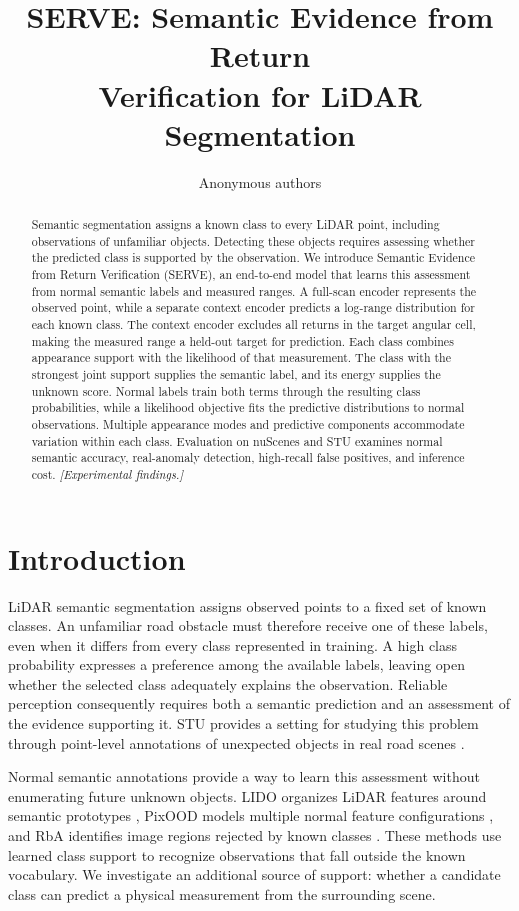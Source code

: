 \documentclass{article}
\title{SERVE: Semantic Evidence from Return\\Verification for LiDAR Segmentation}
\author{Anonymous authors}
\begin{document}
\maketitle

\begin{abstract}
Semantic segmentation assigns a known class to every LiDAR point, including observations of unfamiliar objects. Detecting these objects requires assessing whether the predicted class is supported by the observation. We introduce Semantic Evidence from Return Verification (SERVE), an end-to-end model that learns this assessment from normal semantic labels and measured ranges. A full-scan encoder represents the observed point, while a separate context encoder predicts a log-range distribution for each known class. The context encoder excludes all returns in the target angular cell, making the measured range a held-out target for prediction. Each class combines appearance support with the likelihood of that measurement. The class with the strongest joint support supplies the semantic label, and its energy supplies the unknown score. Normal labels train both terms through the resulting class probabilities, while a likelihood objective fits the predictive distributions to normal observations. Multiple appearance modes and predictive components accommodate variation within each class. Evaluation on nuScenes and STU examines normal semantic accuracy, real-anomaly detection, high-recall false positives, and inference cost. {\color{gray}\textit{[Experimental findings.]}}
\end{abstract}

\section{Introduction}
\label{sec:intro}
LiDAR semantic segmentation assigns observed points to a fixed set of known classes. An unfamiliar road obstacle must therefore receive one of these labels, even when it differs from every class represented in training. A high class probability expresses a preference among the available labels, leaving open whether the selected class adequately explains the observation. Reliable perception consequently requires both a semantic prediction and an assessment of the evidence supporting it. STU provides a setting for studying this problem through point-level annotations of unexpected objects in real road scenes \citep{stu}.

Normal semantic annotations provide a way to learn this assessment without enumerating future unknown objects. LIDO organizes LiDAR features around semantic prototypes \citep{lido}, PixOOD models multiple normal feature configurations \citep{pixood}, and RbA identifies image regions rejected by known classes \citep{rba}. These methods use learned class support to recognize observations that fall outside the known vocabulary. We investigate an additional source of support: whether a candidate class can predict a physical measurement from the surrounding scene.
\end{document}
